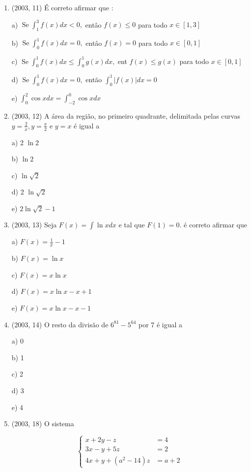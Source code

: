 \documentclass{article}
\begin{document}
\begin{enumerate}
\item(2003, 11) É correto afirmar que :

a) $\operatorname{Se} \int_{1}^{3} f(x) d x<0,$ entâo $f(x) \leq 0$ para todo $x \in[1,3]$

b) $\operatorname{Se} \int_{0}^{1} f(x) d x=0,$ entâo $f(x)=0$ para todo $x \in[0,1]$

c) $\operatorname{Se} \int_{0}^{1} f(x) d x \leq \int_{0}^{1} g(x) d x,$ ent \circ $f(x) \leq g(x)$ para todo $x \in[0,1]$

d) $\operatorname{Se} \int_{0}^{1} f(x) d x=0,$ então $\int_{0}^{1}|f(x)| d x=0$

e) $\int_{0}^{2} \cos x d x=\int_{-2}^{0} \cos x d x$ \newline


\item(2003, 12) A área da região, no primeiro quadrante, delimitada pelas curvas $y=\frac{2}{x}, y= \frac{x}{2}$ e $y=x$ é igual a

a) 2 $\ln 2$

b) $\ln 2$

c) $\ln \sqrt{2}$

d) 2 $\ln \sqrt{2}$

e) $2 \ln \sqrt{2}-1$ \newline



\item(2003, 13) Seja $F(x)=\int \ln x d x$ e tal que $F(1)=0 .$ é correto afirmar que

a) $F(x)=\frac{1}{x}-1$

b) $F(x)=\ln x$

c) $F(x)=x \ln x$

d) $F(x)=x \ln x-x+1$

e) $F(x)=x \ln x-x-1$ \newline



\item(2003, 14) O resto da divisão de $6^{81}-5^{64}$ por 7 é igual a

a) 0

b) 1

c) 2

d) 3

e) 4 \newline



\item(2003, 18) O sistema

$$
\left\{\begin{aligned} x+2 y-z &=4 \\ 3 x-y+5 z &=2 \\ 4 x+y+\left(a^{2}-14\right) z &=a+2 \end{aligned}\right.
$$


\end{enumerate}
\end{document}
